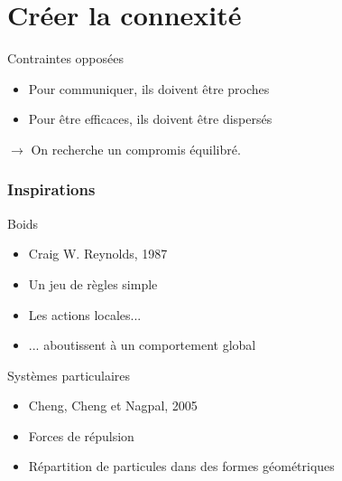 \documentclass{beamer}
\begin{document}
\begin{frame}
  \begin{figure}
    \centering
    
  \end{figure}
\end{frame}

\section{Créer la connexité}

\begin{frame}

  \begin{block}{Contraintes opposées}
    \begin{itemize}
    \item{Pour communiquer, ils doivent être proches}
    \item{Pour être efficaces, ils doivent être dispersés}
    \end{itemize}
  \end{block}

  \vfill

  $\rightarrow$ On recherche un compromis équilibré.

\end{frame}

\begin{frame}

  \frametitle{Inspirations}

  \begin{block}{Boids}
    \begin{itemize}
    \item{Craig W. Reynolds, 1987}
    \item{Un jeu de règles simple}
    \item{Les actions locales...}
    \item{... aboutissent à un comportement global}
    \end{itemize}
  \end{block}

  \vfill

  \begin{block}{Systèmes particulaires}
    \begin{itemize}
    \item{Cheng, Cheng et Nagpal, 2005}
    \item{Forces de répulsion}
    \item{Répartition de particules dans des formes géométriques}
    \end{itemize}
  \end{block}

\end{frame}
\end{document}

